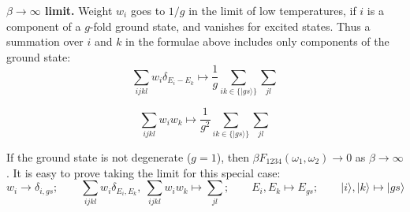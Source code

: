 \documentclass{article}
\begin{document}
{\bf $\beta\to\infty$ limit.}
Weight $w_i$ goes to $1/g$ in the limit of low temperatures, if $i$ is a component of a $g$-fold ground state, and vanishes for excited states.
Thus a summation over $i$ and $k$ in the formulae above includes only components of the ground state:
\[
    \sum_{ijkl} w_i\delta_{E_i-E_k} \mapsto \frac{1}{g}\sum_{ik\in \{|gs\rangle\}}\sum_{jl}
\]

\[
    \sum_{ijkl} w_i w_k \mapsto \frac{1}{g^2}\sum_{ik\in \{|gs\rangle\}}\sum_{jl}
\]

If the ground state is not degenerate ($g=1$), then $\beta F_{1234}(\omega_1,\omega_2) \to 0$ as $\beta\to\infty$.
It is easy to prove taking the limit for this special case:
\[
    w_i \to \delta_{i,gs};
    \qquad \sum_{ijkl} w_i\delta_{E_i,E_k},\ \sum_{ijkl} w_i w_k \mapsto \sum_{jl};
    \qquad E_i, E_k \mapsto E_{gs}; \qquad |i\rangle, |k\rangle \mapsto |gs\rangle
\]
\end{document}
